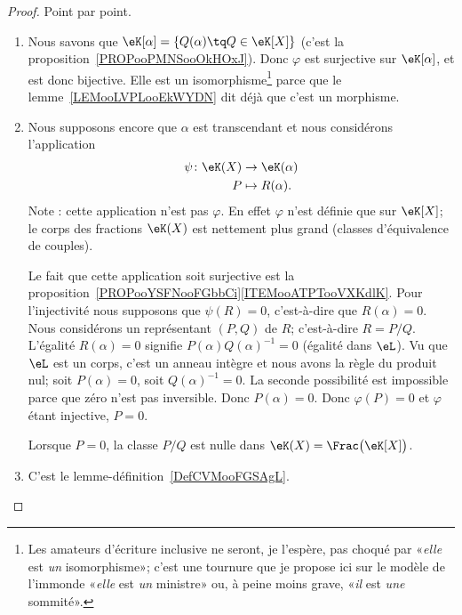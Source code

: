 \begin{proof}
    Point par point.
    \begin{enumerate}
        \item
            Nous savons que \( \eK[\alpha]=\{ Q(\alpha)\tq Q\in \eK[X] \}\) (c'est la proposition~\ref{PROPooPMNSooOkHOxJ}). Donc \( \varphi\) est surjective sur \( \eK[\alpha]\), et est donc bijective. Elle est un isomorphisme\footnote{Les amateurs d'écriture inclusive ne seront, je l'espère, pas choqué par «\emph{elle} est \emph{un} isomorphisme»; c'est une tournure que je propose ici sur le modèle de l'immonde «\emph{elle} est \emph{un} ministre» ou, à peine moins grave, «\emph{il} est \emph{une} sommité».} parce que le lemme~\ref{LEMooLVPLooEkWYDN} dit déjà que c'est un morphisme.
        \item
            Nous supposons encore que \( \alpha\) est transcendant et nous considérons l'application
            \begin{equation}
                \begin{aligned}
                    \psi\colon \eK(X)&\to \eK(\alpha) \\
                    P&\mapsto R(\alpha).
                \end{aligned}
            \end{equation}
            Note : cette application n'est pas \( \varphi\). En effet \( \varphi\) n'est définie que sur \( \eK[X]\); le corps des fractions \( \eK(X)\) est nettement plus grand (classes d'équivalence de couples).

            Le fait que cette application soit surjective est la proposition~\ref{PROPooYSFNooFGbbCi}\ref{ITEMooATPTooVXKdlK}. Pour l'injectivité nous supposons que \( \psi(R)=0\), c'est-à-dire que \( R(\alpha)=0\). Nous considérons un représentant \( (P,Q)\) de \( R\); c'est-à-dire \( R=P/Q\). L'égalité \( R(\alpha)=0\) signifie \( P(\alpha)Q(\alpha)^{-1}=0\) (égalité dans \( \eL\)). Vu que \( \eL\) est un corps, c'est un anneau intègre et nous avons la règle du produit nul; soit \( P(\alpha)=0\), soit \( Q(\alpha)^{-1}=0\). La seconde possibilité est impossible parce que zéro n'est pas inversible. Donc \( P(\alpha)=0\). Donc \( \varphi(P)=0\) et \( \varphi\) étant injective, \( P=0\).

            Lorsque \( P=0\), la classe \( P/Q\) est nulle dans \( \eK(X)= \Frac\big(\eK[X]\big)\).

        \item

            C'est le lemme-définition~\ref{DefCVMooFGSAgL}.
    \end{enumerate}
\end{proof}

